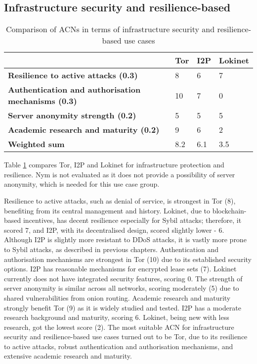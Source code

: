 \subsection{Infrastructure security and resilience-based}

\begin{table}[!ht]
\caption{Comparison of ACNs in terms of infrastructure security and resilience-based use cases}
\label{tab:security_resilience_uc}
\small
\begin{tabular}{|p{}|p{}|p{}|p{}|}
\hline
\textbf{} & \textbf{Tor} & \textbf{I2P} & \textbf{Lokinet} \\
\hline
\textbf{Resilience to active attacks (0.3)} & 8 & 6 & 7 \\
\hline
\textbf{Authentication and authorisation mechanisms (0.3)} & 10 & 7 & 0 \\
\hline
\textbf{Server anonymity strength (0.2)} & 5 & 5 & 5 \\
\hline
\textbf{Academic research and maturity (0.2)} & 9 & 6 & 2 \\
\hline
\textbf{Weighted sum} & 8.2 & 6.1 & 3.5 \\
\hline
\end{tabular}
\end{table}

Table \ref{tab:security_resilience_uc} compares Tor, I2P and Lokinet for infrastructure protection and resilience. Nym is not evaluated as it does not provide a possibility of server anonymity, which is needed for this use case group.

Resilience to active attacks, such as denial of service, is strongest in Tor (8), benefiting from its central management and history. Lokinet, due to blockchain-based incentives, has decent resilience especially for Sybil attacks; therefore, it scored 7, and I2P, with its decentralised design, scored slightly lower - 6. Although I2P is slightly more resistant to DDoS attacks, it is vastly more prone to Sybil attacks, as described in previous chapters.
Authentication and authorisation mechanisms are strongest in Tor (10) due to its established security options. I2P has reasonable mechanisms for encrypted lease sets (7). Lokinet currently does not have integrated security features, scoring 0.
The strength of server anonymity is similar across all networks, scoring moderately (5) due to shared vulnerabilities from onion routing.
Academic research and maturity strongly benefit Tor (9) as it is widely studied and tested. I2P has a moderate research background and maturity, scoring 6. Lokinet, being new with less research, got the lowest score (2).
The most suitable ACN for infrastructure security and resilience-based use cases turned out to be Tor, due to its resilience to active attacks, robust authentication and authorisation mechanisms, and extensive academic research and maturity.
